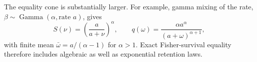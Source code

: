 The equality cone is substantially larger.  For example, gamma mixing of the rate,
$\beta\sim\operatorname{Gamma}(\alpha,\text{rate }a)$, gives
\begin{equation}
 S(\nu)=\left(\frac{a}{a+\nu}\right)^\alpha,
 \qquad
 q(\omega)=\frac{\alpha a^\alpha}{(a+\omega)^{\alpha+1}},
 \label{eq:algebraic-equality}
\end{equation}
with finite mean $\bar\omega=a/(\alpha-1)$ for $\alpha>1$.  Exact Fisher-survival equality therefore includes algebraic as well as exponential retention laws.
